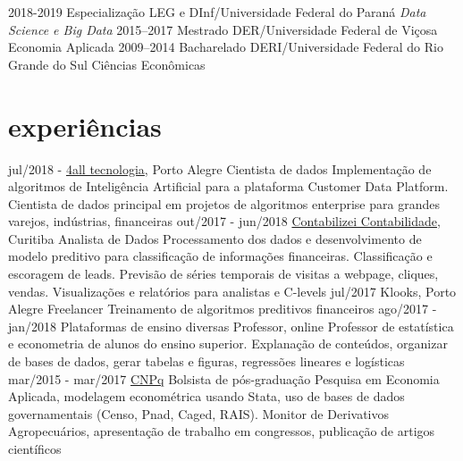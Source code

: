 \documentclass[]{friggeri-cv}
\begin{document}
\begin{entrylist}
  \entry
    {2018-2019}
    {Especialização}
    {LEG e DInf/Universidade Federal do Paraná}
    {\emph{Data Science e Big Data}}
  \entry
    {2015–2017}
    {Mestrado}
    {DER/Universidade Federal de Viçosa}
    {Economia Aplicada}
  \entry
    {2009–2014}
    {Bacharelado}
    {DERI/Universidade Federal do Rio Grande do Sul}
    {Ciências Econômicas}
\end{entrylist}

\section{experiências}

\begin{entrylist}
  \entry
    {jul/2018 - }
    {\href{https://4all.com}{4all tecnologia}, Porto Alegre}
    {Cientista de dados}
    {Implementação de algoritmos de Inteligência Artificial para a plataforma Customer Data Platform.
    Cientista de dados principal em projetos de algoritmos enterprise para grandes varejos, indústrias, financeiras}
  \entry
    {out/2017 - jun/2018}
    {\href{https://www.contabilizei.com.br}{Contabilizei Contabilidade}, Curitiba}
    {Analista de Dados}
    {Processamento dos dados e desenvolvimento de modelo preditivo para classificação de informações financeiras.
    Classificação e escoragem de leads.
    Previsão de séries temporais de visitas a webpage, cliques, vendas.
    Visualizações e relatórios para analistas e C-levels}
  \entry
    {jul/2017}
    {Klooks, Porto Alegre}
    {Freelancer}
    {Treinamento de algoritmos preditivos financeiros}
  \entry
    {ago/2017 - jan/2018}
    {Plataformas de ensino diversas}
    {Professor, online}
    {Professor de estatística e econometria de alunos do ensino superior.
    Explanação de conteúdos, organizar de bases de dados, gerar tabelas e figuras, regressões lineares e logísticas}
  \entry
    {mar/2015 - mar/2017}
    {\href{cnpq.br}{CNPq}}
    {Bolsista de pós-graduação}
    {Pesquisa em Economia Aplicada, modelagem econométrica usando Stata, uso de bases de dados governamentais (Censo, Pnad, Caged, RAIS).
    Monitor de Derivativos Agropecuários, apresentação de trabalho em congressos, publicação de artigos científicos}
\end{entrylist}
\end{document}
